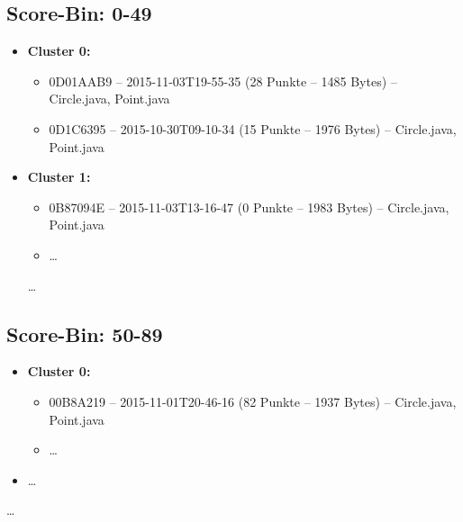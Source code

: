 \subsection*{Score-Bin: 0-49}
\begin{itemize}
  \item \textbf{Cluster 0:}
  \begin{itemize}
    \item 0D01AAB9 -- 2015-11-03T19-55-35 (28 Punkte -- 1485 Bytes) -- Circle.java, Point.java
    \item 0D1C6395 -- 2015-10-30T09-10-34 (15 Punkte -- 1976 Bytes) -- Circle.java, Point.java
  \end{itemize}
  \item \textbf{Cluster 1:}
  \begin{itemize}
    \item 0B87094E -- 2015-11-03T13-16-47 (0 Punkte -- 1983 Bytes) -- Circle.java, Point.java
    \item \dots
  \end{itemize}
  \dots
\end{itemize}

\subsection*{Score-Bin: 50-89}
\begin{itemize}
  \item \textbf{Cluster 0:}
  \begin{itemize}
    \item 00B8A219 -- 2015-11-01T20-46-16 (82 Punkte -- 1937 Bytes) -- Circle.java, Point.java
    \item \dots
  \end{itemize}
  \item \dots
\end{itemize}
\dots

